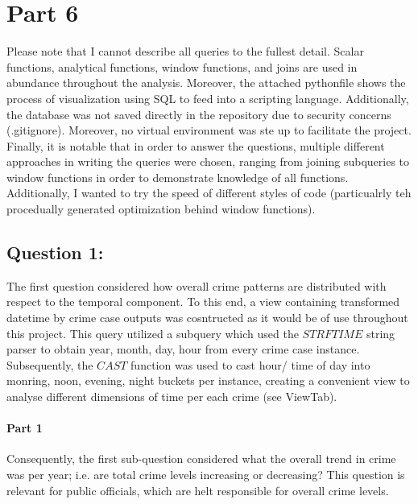 \documentclass[a4paper]{article}
\begin{document}



\section{Part 6}

Please note that I cannot describe all queries to the fullest detail. Scalar functions, analytical functions, window functions, and joins are used in abundance throughout the analysis. Moreover, the attached pythonfile shows the process of visualization using SQL to feed into a scripting language. 
Additionally, the database was not saved directly in the repository due to security concerns (.gitignore). Moreover, no virtual environment was ste up to facilitate the project. Finally, it is notable that in order to answer the questions, multiple different approaches in writing the queries were chosen, ranging from joining subqueries to window functions in order to demonstrate knowledge of all functions. Additionally, I wanted to try the speed of different styles of code (particualrly teh procedually generated optimization behind window functions).

\subsection{Question 1:}


The first question considered how overall crime patterns are distributed with respect to the temporal component. To this end, a view containing transformed datetime by crime case  outputs was cosntructed as it would be of use throughout this project. This query utilized a subquery which used the $STRFTIME$ string parser to obtain year, month, day, hour from every crime case instance. Subsequently, the $CAST$ function was used to cast hour/ time of day into monring, noon, evening, night buckets per instance, creating a convenient view to analyse different dimensions of time per each crime (see ViewTab).


\paragraph{Part 1} Consequently, the first sub-question considered what the overall trend in crime was per year; i.e. are total crime levels increasing or decreasing? This question is relevant for public officials, which are helt responsible for overall crime levels. 
\end{document}
